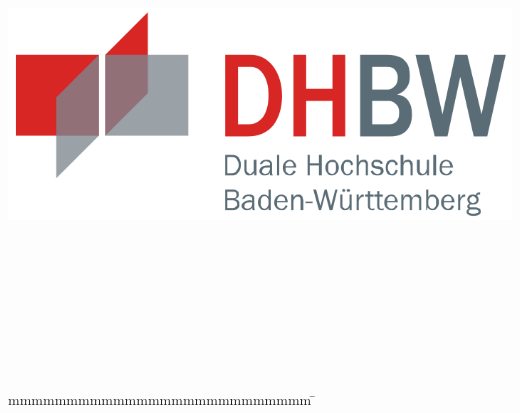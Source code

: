 
\begin{titlepage}
	\begin{center}
	    \includegraphics[height=0.1\textwidth]{images/dhbw.png}	    
	\end{center}

	\enlargethispage{15mm}
	\begin{center}
		\vspace*{12mm}	{\LARGE\textbf \titel }\\
		\vspace*{12mm}	{\large\textbf \arbeit}\\
		\vspace*{12mm}	\langdeckblattabschlusshinleitung\\
		\vspace*{3mm}		{\textbf \abschluss}\\
		\vspace*{12mm}	\langartikelstudiengang{} \langstudiengang{} \studiengang\\
		\vspace*{3mm}		\langanderdh{} \dhbw\\
		\vspace*{12mm}	\datumAbgabe\\
		\vspace*{12mm}
	\end{center}
	\vfill
	\begin{spacing}{1.2}
		\begin{tabbing}
			mmmmmmmmmmmmmmmmmmmmmmmmmm             \= \kill
			\textbf{\langdbbearbeitungszeit}       \>  \zeitraum\\
			\textbf{\langdbkurs}  \>  \kurs\\
			\textbf{\langdbgutachter}              \>  \gutachter
		\end{tabbing}
	\end{spacing}
\end{titlepage}
